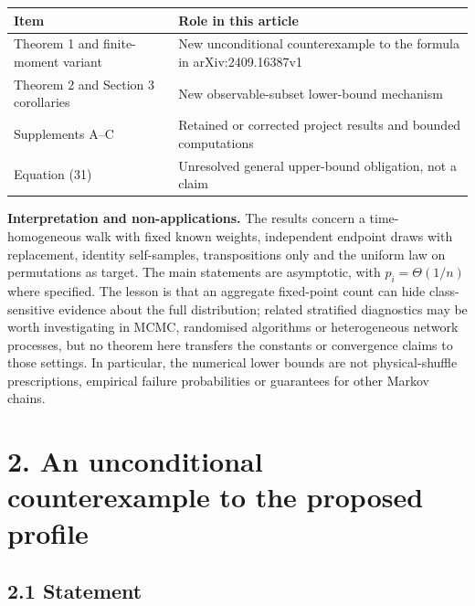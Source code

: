 \documentclass[
  british,
  11pt,
]{article}
\newcounter{none} %
\begin{document}
{\def\LTcaptype{none} %
\begin{longtable}[]{@{}
  >{\raggedright\arraybackslash}p{}
  >{\raggedright\arraybackslash}p{}@{}}
\toprule\noalign{}
\begin{minipage}[b]{\linewidth}\raggedright
Item
\end{minipage} & \begin{minipage}[b]{\linewidth}\raggedright
Role in this article
\end{minipage} \\
\midrule\noalign{}
\endhead
\bottomrule\noalign{}
\endlastfoot
Theorem 1 and finite-moment variant & New unconditional counterexample
to the formula in arXiv:2409.16387v1 \\
Theorem 2 and Section 3 corollaries & New observable-subset lower-bound
mechanism \\
Supplements A--C & Retained or corrected project results and bounded
computations \\
Equation (31) & Unresolved general upper-bound obligation, not a
claim \\
\end{longtable}
}

\textbf{Interpretation and non-applications.} The results concern a
time-homogeneous walk with fixed known weights, independent endpoint
draws with replacement, identity self-samples, transpositions only and
the uniform law on permutations as target. The main statements are
asymptotic, with \(p_i=\Theta(1/n)\) where specified. The lesson is that
an aggregate fixed-point count can hide class-sensitive evidence about
the full distribution; related stratified diagnostics may be worth
investigating in MCMC, randomised algorithms or heterogeneous network
processes, but no theorem here transfers the constants or convergence
claims to those settings. In particular, the numerical lower bounds are
not physical-shuffle prescriptions, empirical failure probabilities or
guarantees for other Markov chains.

\section{2. An unconditional counterexample to the proposed
profile}\label{an-unconditional-counterexample-to-the-proposed-profile}

\subsection{2.1 Statement}\label{statement}
\end{document}
